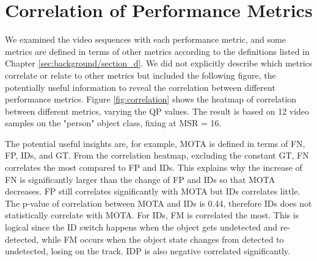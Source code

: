 \section{Correlation of Performance Metrics}
\label{sec:appendix/section_c}

We examined the video sequences with each performance metric, and some metrics are defined in terms of other metrics according to the definitions listed in Chapter \ref{sec:background/section_d}. We did not explicitly describe which metrics correlate or relate to other metrics but included the following figure, the potentially useful information to reveal the correlation between different performance metrics. Figure \ref{fig:correlation} shows the heatmap of correlation between different metrics, varying the QP values. The result is based on 12 video samples on the "person" object class, fixing at MSR = 16.

The potential useful insights are, for example, MOTA is defined in terms of FN, FP, IDs, and GT. From the correlation heatmap, excluding the constant GT, FN correlates the most compared to FP and IDs. This explains why the increase of FN is significantly larger than the change of FP and IDs so that MOTA decreases. FP still correlates significantly with MOTA but IDs correlates little. The p-value of correlation between MOTA and IDs is 0.44, therefore IDs does not statistically correlate with MOTA. For IDs, FM is correlated the most. This is logical since the ID switch happens when the object gets undetected and re-detected, while FM occurs when the object state changes from detected to undetected, losing on the track. IDP is also negative correlated significantly.
